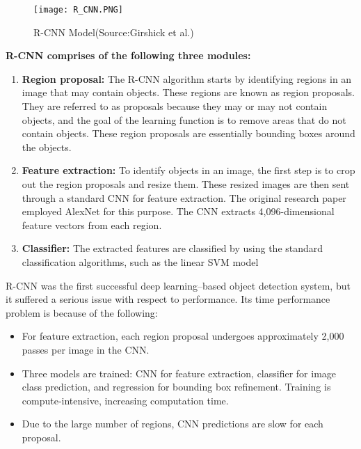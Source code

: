     \begin{figure}[H]
         \centering
         \texttt{[image: R\_CNN.PNG]}
         \caption{R-CNN Model(Source:Girshick et al.)}
            \label{fig:R-CNN Model}
    \end{figure}
\textbf{R-CNN comprises of the following three modules:}\\
        \begin{enumerate}
            \item \textbf{Region proposal: } The R-CNN algorithm starts by identifying regions in an image that may contain objects. These regions are known as region proposals. They are referred to as proposals because they may or may not contain objects, and the goal of the learning function is to remove areas that do not contain objects. These region proposals are essentially bounding boxes around the objects.
            \item \textbf{Feature extraction:} To identify objects in an image, the first step is to crop out the region proposals and resize them. These resized images are then sent through a standard CNN for feature extraction. The original research paper employed AlexNet for this purpose. The CNN extracts 4,096-dimensional feature vectors from each region.
            \item  \textbf{Classifier: } The extracted features are classified by using the standard classification algorithms, such as the linear SVM model 
        \end{enumerate}
R-CNN was the first successful deep learning–based object detection system, but it suffered a serious issue with respect to performance. Its time performance problem is because of the following:
    \begin{itemize}
         \item For feature extraction, each region proposal undergoes approximately 2,000 passes per image in the CNN.
        \item Three models are trained: CNN for feature extraction, classifier for image class prediction, and regression for bounding box refinement. Training is compute-intensive, increasing computation time.
        \item Due to the large number of regions, CNN predictions are slow for each proposal.
    \end{itemize}
        
